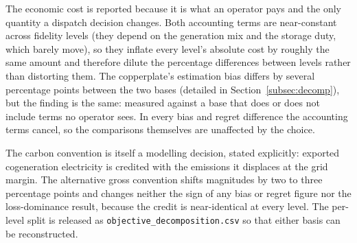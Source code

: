 The economic cost is reported because it is what an operator pays and the only quantity a dispatch
decision changes. Both accounting terms are near-constant across fidelity levels (they depend on
the generation mix and the storage duty, which barely move), so they inflate every level's
absolute cost by roughly the same amount and therefore dilute the percentage differences between
levels rather than distorting them. The copperplate's estimation bias differs by several
percentage points between the two bases (detailed in Section~\ref{subsec:decomp}), but the finding
is the same: measured against a base that does or does not include terms no operator sees. In
every bias and regret difference the accounting terms cancel, so the comparisons themselves are
unaffected by the choice.

The carbon convention is itself a modelling decision, stated explicitly: exported cogeneration
electricity is credited with the emissions it displaces at the grid margin. The alternative gross
convention shifts magnitudes by two to three percentage points and changes neither the sign of
any bias or regret figure nor the loss-dominance result, because the credit is near-identical at
every level. The per-level split is released as \texttt{objective\_decomposition.csv} so that either basis can be reconstructed.


